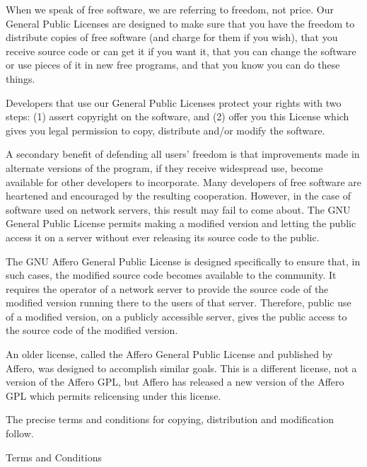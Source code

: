\documentclass{article}%
\begin{document}
When we speak of free software, we are referring to freedom, not
price.  Our General Public Licenses are designed to make sure that you
have the freedom to distribute copies of free software (and charge for
them if you wish), that you receive source code or can get it if you
want it, that you can change the software or use pieces of it in new
free programs, and that you know you can do these things.

Developers that use our General Public Licenses protect your rights
with two steps: (1) assert copyright on the software, and (2) offer
you this License which gives you legal permission to copy, distribute
and/or modify the software.

A secondary benefit of defending all users' freedom is that
improvements made in alternate versions of the program, if they
receive widespread use, become available for other developers to
incorporate.    Many developers of free software are heartened and
encouraged by the resulting cooperation.        However, in the case of
software used on network servers, this result may fail to come about.
The GNU General Public License permits making a modified version and
letting the public access it on a server without ever releasing its
source code to the public.

The GNU Affero General Public License is designed specifically to
ensure that, in such cases, the modified source code becomes available
to the community.        It requires the operator of a network server to
provide the source code of the modified version running there to the
users of that server.    Therefore, public use of a modified version, on
a publicly accessible server, gives the public access to the source
code of the modified version.

An older license, called the Affero General Public License and
published by Affero, was designed to accomplish similar goals.  This is
a different license, not a version of the Affero GPL, but Affero has
released a new version of the Affero GPL which permits relicensing under
this license.

The precise terms and conditions for copying, distribution and
modification follow.

\begin{center}
{\Large \sc Terms and Conditions}
\end{center}
\end{document}
